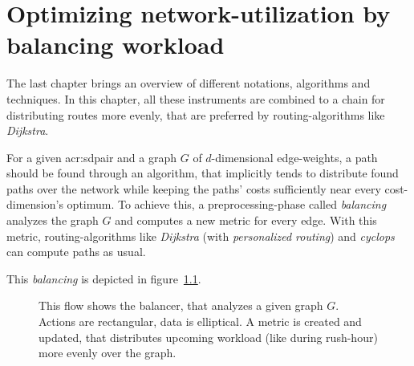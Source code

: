 \chapter{Optimizing network-utilization by balancing workload}
\label{chap:balancing}

The last chapter brings an overview of different notations, algorithms and techniques.
In this chapter, all these instruments are combined to a chain for distributing routes more evenly, that are preferred by routing-algorithms like \textit{Dijkstra}.

For a given \gls{acr:sdpair} and a graph $G$ of $d$-dimensional edge-weights, a path should be found through an algorithm, that implicitly tends to distribute found paths over the network while keeping the paths' costs sufficiently near every cost-dimension's optimum.
To achieve this, a preprocessing-phase called \textit{balancing} analyzes the graph $G$ and computes a new metric for every edge.
With this metric, routing-algorithms like \textit{Dijkstra}  (with \textit{personalized routing}) and \textit{cyclops} can compute paths as usual.

This \textit{balancing} is depicted in figure~\ref{fig:balancing}.

\begin{figure}
    \centering
    
    \caption[Overview of balancing a graph]{%
        This flow shows the balancer, that analyzes a given graph $G$.
        Actions are rectangular, data is elliptical.
        A metric is created and updated, that distributes upcoming workload (like during rush-hour) more evenly over the graph.
        \label{fig:balancing}
    }
\end{figure}



